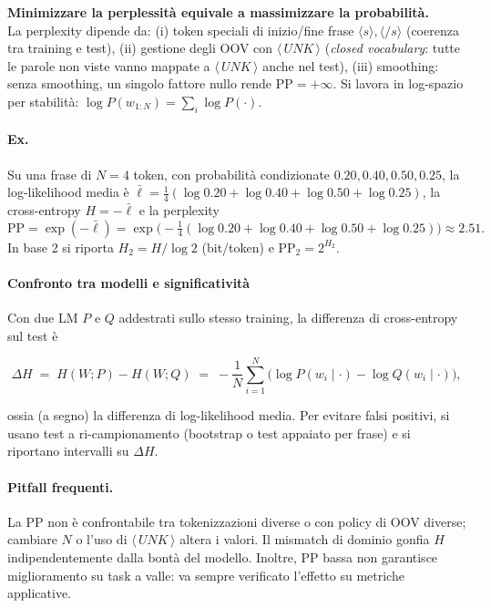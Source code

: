         \textbf{Minimizzare la perplessità equivale a massimizzare la probabilità.}\\
        
        La perplexity dipende da: (i) token speciali di inizio/fine frase $\langle s\rangle,\langle/ s\rangle$ (coerenza tra training e test), (ii) gestione degli OOV con $\langle\,UNK\,\rangle$ (\textit{closed vocabulary}: tutte le parole non viste vanno mappate a $\langle\,UNK\,\rangle$ anche nel test), (iii) smoothing: senza smoothing, un singolo fattore nullo rende $\mathrm{PP}=+\infty$. Si lavora in log-spazio per stabilità: $\log P(w_{1:N}) = \sum_i \log P(\cdot)$.
        
        \paragraph{Ex.\\}
        Su una frase di $N=4$ token, con probabilità condizionate $0.20, 0.40, 0.50, 0.25$, la log-likelihood media è $\bar{\ell}=\tfrac{1}{4}(\log 0.20+\log 0.40+\log 0.50+\log 0.25)$, la cross-entropy $H=-\bar{\ell}$ e la perplexity
        \[
        \mathrm{PP} = \exp(-\bar{\ell}) = \exp\!\Big( -\tfrac{1}{4}(\log 0.20+\log 0.40+\log 0.50+\log 0.25) \Big) \approx 2.51.
        \]
        In base 2 si riporta $H_2=H/\log 2$ (bit/token) e $\mathrm{PP}_2=2^{H_2}$.\\
        
        \paragraph{Confronto tra modelli e significatività}
        Con due LM $P$ e $Q$ addestrati sullo stesso training, la differenza di cross-entropy sul test è
        
        $$
        \Delta H \;=\; H(W;P) - H(W;Q) \;=\; -\frac{1}{N} \sum_{i=1}^{N} \big( \log P(w_i\mid\cdot) - \log Q(w_i\mid\cdot) \big),
        $$
        
        ossia (a segno) la differenza di log-likelihood media. Per evitare falsi positivi, si usano test a ri-campionamento (bootstrap o test appaiato per frase) e si riportano intervalli su $\Delta H$.
        
        \paragraph{Pitfall frequenti.}
        La PP non è confrontabile tra tokenizzazioni diverse o con policy di OOV diverse; cambiare $N$ o l’uso di $\langle\,UNK\,\rangle$ altera i valori. Il mismatch di dominio gonfia $H$ indipendentemente dalla bontà del modello. Inoltre, PP bassa non garantisce miglioramento su task a valle: va sempre verificato l’effetto su metriche applicative.

